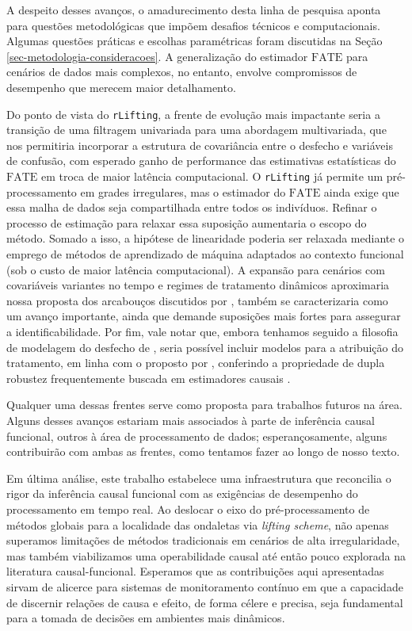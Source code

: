 A despeito desses avanços, o amadurecimento desta linha de pesquisa aponta para questões metodológicas que impõem desafios técnicos e computacionais. 
Algumas questões práticas e escolhas paramétricas foram discutidas na Seção \ref{sec-metodologia-consideracoes}. 
A generalização do estimador \(\mathrm{FATE}\) para cenários de dados mais complexos, no entanto, envolve compromissos de desempenho que merecem maior detalhamento.

Do ponto de vista do \texttt{rLifting}, a frente de evolução mais impactante seria a transição de uma filtragem univariada para uma abordagem multivariada, que nos permitiria incorporar a estrutura de covariância entre o desfecho e variáveis de confusão, com esperado ganho de performance das estimativas estatísticas do \(\mathrm{FATE}\) em troca de maior latência computacional. 
O \texttt{rLifting} já permite um pré-processamento em grades irregulares, mas o estimador do \(\mathrm{FATE}\) ainda exige que essa malha de dados seja compartilhada entre todos os indivíduos. 
Refinar o processo de estimação para relaxar essa suposição aumentaria o escopo do método. 
Somado a isso, a hipótese de linearidade poderia ser relaxada mediante o emprego de métodos de aprendizado de máquina adaptados ao contexto funcional (sob o custo de maior latência computacional). 
A expansão para cenários com covariáveis variantes no tempo e regimes de tratamento dinâmicos aproximaria nossa proposta dos arcabouços discutidos por , também se caracterizaria como um avanço importante, ainda que demande suposições mais fortes para assegurar a identificabilidade. 
Por fim, vale notar que, embora tenhamos seguido a filosofia de modelagem do desfecho de , seria possível incluir modelos para a atribuição do tratamento, em linha com o proposto por , conferindo a propriedade de dupla robustez frequentemente buscada em estimadores causais \cite{hernan_causal_2023}.

Qualquer uma dessas frentes serve como proposta para trabalhos futuros na área. 
Alguns desses avanços estariam mais associados à parte de inferência causal funcional, outros à área de processamento de dados; esperançosamente, alguns contribuirão com ambas as frentes, como tentamos fazer ao longo de nosso texto.

Em última análise, este trabalho estabelece uma infraestrutura que reconcilia o rigor da inferência causal funcional com as exigências de desempenho do processamento em tempo real. 
Ao deslocar o eixo do pré-processamento de métodos globais para a localidade das ondaletas via \emph{lifting scheme}, não apenas superamos limitações de métodos tradicionais em cenários de alta irregularidade, mas também viabilizamos uma operabilidade causal até então pouco explorada na literatura causal-funcional. 
Esperamos que as contribuições aqui apresentadas sirvam de alicerce para sistemas de monitoramento contínuo em que a capacidade de discernir relações de causa e efeito, de forma célere e precisa, seja fundamental para a tomada de decisões em ambientes mais dinâmicos.